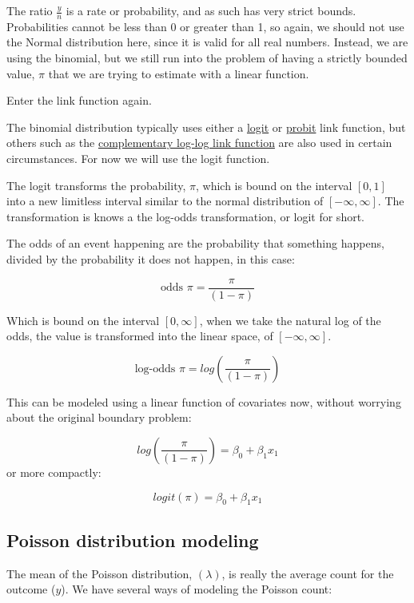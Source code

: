 \documentclass[
]{article}
\begin{document}
The ratio \(\frac{y}{n}\) is a rate or probability, and as such has very strict bounds. Probabilities cannot be less than 0 or greater than 1, so again, we should not use the Normal distribution here, since it is valid for all real numbers. Instead, we are using the binomial, but we still run into the problem of having a strictly bounded value, \(\pi\) that we are trying to estimate with a linear function.

Enter the link function again.

The binomial distribution typically uses either a \href{https://en.wikipedia.org/wiki/Logit}{logit} or \href{https://en.wikipedia.org/wiki/Probit}{probit} link function, but others such as the \href{http://data.princeton.edu/wws509/notes/c3s7.html}{complementary log-log link function} are also used in certain circumstances. For now we will use the logit function.

The logit transforms the probability, \(\pi\), which is bound on the interval \([0,1]\) into a new limitless interval similar to the normal distribution of \([-\infty, \infty]\). The transformation is knows a the log-odds transformation, or logit for short.

The odds of an event happening are the probability that something happens, divided by the probability it does not happen, in this case:

\[\text{odds }{\pi} = \frac{\pi}{(1-\pi)}\]

Which is bound on the interval \([0, \infty]\), when we take the natural log of the odds, the value is transformed into the linear space, of \([-\infty, \infty]\).

\[\text{log-odds }{\pi} = log  \left ( \frac{\pi}{(1-\pi)}  \right) \]

This can be modeled using a linear function of covariates now, without worrying about the original boundary problem:

\[log  \left ( \frac{\pi}{(1-\pi)}  \right) = \beta_0 +\beta_1 x_1\] or more compactly:

\[log it(\pi)  = \beta_0 +\beta_1 x_1\]

\hypertarget{poisson-distribution-modeling}{%
\subsection{Poisson distribution modeling}\label{poisson-distribution-modeling}}

The mean of the Poisson distribution, \((\lambda)\), is really the average count for the outcome (\(y\)). We have several ways of modeling the Poisson count:
\end{document}
